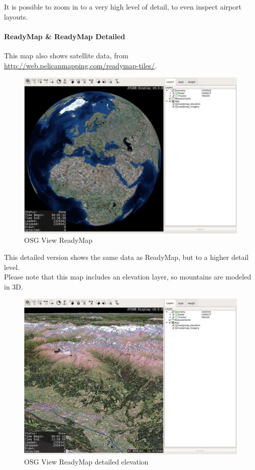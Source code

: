 It is possible to zoom in to a very high level of detail, to even inspect airport layouts.

\newpage
\paragraph{ReadyMap \& ReadyMap Detailed}

This map also shows satellite data, from \url{http://web.pelicanmapping.com/readymap-tiles/}.

\begin{figure}[H]
    \hspace*{-2.5cm}
    \includegraphics[width=19cm,frame]{figures/osgview_ready.png}
  \caption{OSG View ReadyMap}
\end{figure}

This detailed version shows the same data as ReadyMap, but to a higher detail level. \\

Please note that this map includes an elevation layer, so mountains are modeled in 3D.

\begin{figure}[H]
    \hspace*{-2.5cm}
    \includegraphics[width=19cm]{figures/osgview_readymap_elav.png}
  \caption{OSG View ReadyMap detailed elevation}
\end{figure}


